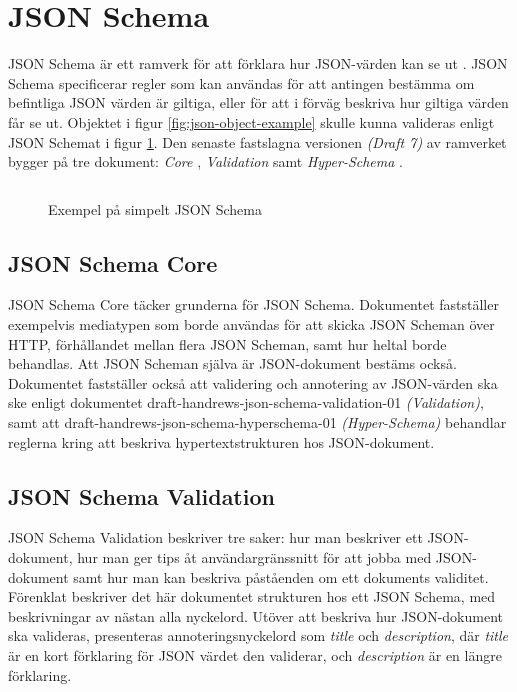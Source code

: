 \section{JSON Schema}
\label{sec:teori:schema}
JSON Schema är ett ramverk för att förklara hur JSON-värden kan se ut \cite{A.Wright}. JSON Schema specificerar regler som kan användas för att antingen bestämma om befintliga JSON värden är giltiga, eller för att i förväg beskriva hur giltiga värden får se ut. Objektet i figur \ref{fig:json-object-example} skulle kunna valideras enligt JSON Schemat i figur \ref{fig:json-schema-example}. Den senaste fastslagna versionen \textit{(Draft 7)} \cite{TheJSONSchemaorganisationa} av ramverket bygger på tre dokument: \textit{Core} \cite{A.Wright}, \textit{Validation} \cite{Andrews2018} samt \textit{Hyper-Schema} \cite{Andrews2018a}.

\begin{figure}
	\inputminted[tabsize=2, frame=single, fontsize=\small, framesep=2mm]{json}{code/simple/schema.json}
	\vspace{-1.7em}
	\caption{Exempel på simpelt JSON Schema}
	\label{fig:json-schema-example}
\end{figure}

\subsection{JSON Schema Core}
JSON Schema Core täcker grunderna för JSON Schema. Dokumentet fastställer exempelvis mediatypen som borde användas för att skicka JSON Scheman över HTTP, förhållandet mellan flera JSON Scheman, samt hur heltal borde behandlas. Att JSON Scheman själva är JSON-dokument bestäms också. Dokumentet fastställer också att validering och annotering av JSON-värden ska ske enligt dokumentet draft-handrews-json-schema-validation-01 \textit{(Validation)}, samt att draft-handrews-json-schema-hyperschema-01 \textit{(Hyper-Schema)} behandlar reglerna kring att beskriva hypertextstrukturen hos JSON-dokument. \cite{A.Wright}

\subsection{JSON Schema Validation}
JSON Schema Validation beskriver tre saker: hur man beskriver ett JSON-dokument, hur man ger tips åt användargränssnitt för att jobba med JSON-dokument samt hur man kan beskriva påståenden om ett dokuments validitet. Förenklat beskriver det här dokumentet strukturen hos ett JSON Schema, med beskrivningar av nästan alla nyckelord. Utöver att beskriva hur JSON-dokument ska valideras, presenteras annoteringsnyckelord som \textit{title} och \textit{description}, där \textit{title} är en kort förklaring för JSON värdet den validerar, och \textit{description} är en längre förklaring. \cite{Andrews2018}


